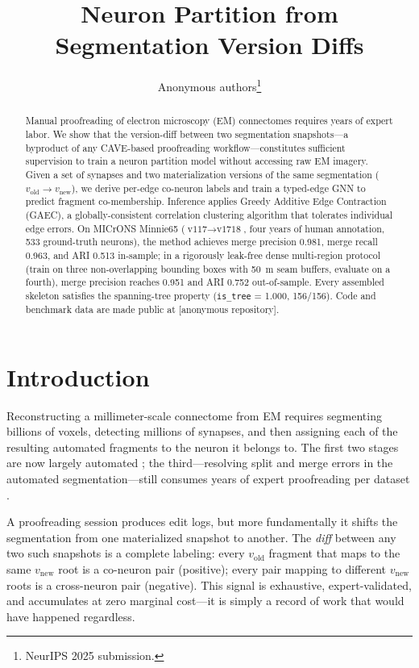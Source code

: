 \documentclass[10pt,letterpaper]{article}
\title{Neuron Partition from Segmentation Version Diffs}
\author{Anonymous authors\thanks{NeurIPS 2025 submission.}}
\date{}
\begin{document}
\maketitle

\begin{abstract}
Manual proofreading of electron microscopy (EM) connectomes requires years of expert
labor. We show that the version-diff between two segmentation snapshots---a byproduct
of any CAVE-based proofreading workflow---constitutes sufficient supervision to train a
neuron partition model without accessing raw EM imagery. Given a set of synapses and
two materialization versions of the same segmentation ($v_\text{old} \to v_\text{new}$),
we derive per-edge co-neuron labels and train a typed-edge GNN to predict fragment
co-membership. Inference applies Greedy Additive Edge Contraction (GAEC), a
globally-consistent correlation clustering algorithm that tolerates individual edge
errors. On MICrONS Minnie65 ($\text{v117} \to \text{v1718}$, four years of human
annotation, 533 ground-truth neurons), the method achieves merge precision 0.981,
merge recall 0.963, and ARI 0.513 in-sample; in a rigorously leak-free dense
multi-region protocol (train on three non-overlapping bounding boxes with 50~\textmu{}m
seam buffers, evaluate on a fourth), merge precision reaches 0.951 and ARI 0.752
out-of-sample. Every assembled skeleton satisfies the spanning-tree property
(\texttt{is\_tree} = 1.000, 156/156). Code and benchmark data are made public at
[anonymous repository].
\end{abstract}

\section{Introduction}

Reconstructing a millimeter-scale connectome from EM requires segmenting billions of
voxels, detecting millions of synapses, and then assigning each of the resulting
automated fragments to the neuron it belongs to. The first two stages are now largely
automated \cite{microns2021}; the third---resolving split and merge errors in the
automated segmentation---still consumes years of expert proofreading per dataset
\cite{microns2021,flywire2023}.

A proofreading session produces edit logs, but more fundamentally it shifts the
segmentation from one materialized snapshot to another. The \emph{diff} between any two
such snapshots is a complete labeling: every $v_\text{old}$ fragment that maps to the
same $v_\text{new}$ root is a co-neuron pair (positive); every pair mapping to different
$v_\text{new}$ roots is a cross-neuron pair (negative). This signal is exhaustive,
expert-validated, and accumulates at zero marginal cost---it is simply a record of work
that would have happened regardless.
\end{document}
